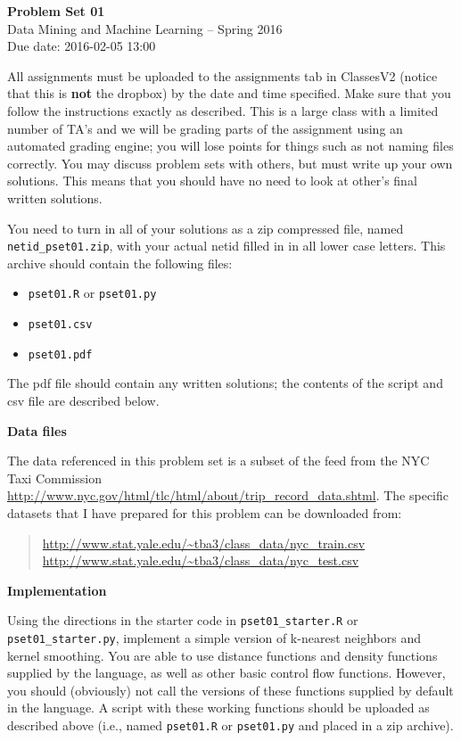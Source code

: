 \documentclass[12pt]{article}
\begin{document}
\begin{center}
{\bf Problem Set 01} \\
Data Mining and Machine Learning -- Spring 2016 \\
Due date: 2016-02-05 13:00
\end{center}

\medskip

All assignments must be uploaded to the assignments tab in ClassesV2
(notice that this is \textbf{not} the dropbox) by the date and time specified.
Make sure that you follow the instructions exactly as described.
This is a large class with a limited number of TA's and we will be
grading parts of the assignment using an automated grading engine;
you will lose points for things such as not naming files correctly.
You may discuss problem sets with others, but must write up your own
solutions. This means that you should have no need to look at other's
final written solutions.

You need to turn in all of your solutions as a zip compressed file, named
\texttt{netid\_pset01.zip}, with your actual netid filled in in all lower
case letters. This archive should contain the following files:
\begin{itemize}
\item \texttt{pset01.R} or \texttt{pset01.py}
\item \texttt{pset01.csv}
\item \texttt{pset01.pdf}
\end{itemize}
The pdf file should contain any written solutions; the contents of the
script and csv file are described below.

\medskip

\textbf{Data files}

The data referenced in this problem set is a subset of the feed from the
NYC Taxi Commission \url{http://www.nyc.gov/html/tlc/html/about/trip_record_data.shtml}.
The specific datasets that I have prepared for this
problem can be downloaded from:
\begin{quote}
\url{http://www.stat.yale.edu/~tba3/class_data/nyc_train.csv} \\
\url{http://www.stat.yale.edu/~tba3/class_data/nyc_test.csv}
\end{quote}

\textbf{Implementation}

Using the directions in the starter code in \texttt{pset01\_starter.R} or
\texttt{pset01\_starter.py}, implement a simple version of k-nearest
neighbors and kernel smoothing. You are able to use distance functions and
density functions supplied by the language, as well as other basic control
flow functions. However, you should (obviously) not call the versions of
these functions supplied by default in the language. A script with these
working functions should be uploaded as described above (i.e., named
\texttt{pset01.R} or \texttt{pset01.py} and placed in a zip archive).
\end{document}
